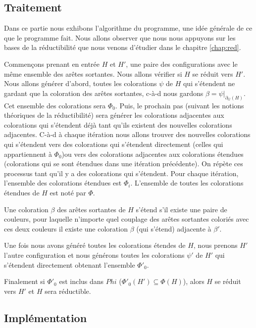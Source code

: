 \documentclass[10pt,a4paper]{article}
\begin{document}
\subsection{Traitement}

Dans ce partie nous exhibons l'algorithme du programme, une idée générale de ce que le programme fait. Nous allons observer que nous nous appuyons sur les bases de la réductibilité que nous venons d'étudier dans le chapitre \ref{chap:red}. 

Commençons prenant en entrée $H$ et $H'$, une paire des configurations avec le même ensemble des arêtes sortantes. Nous allons vérifier si $H$ se réduit vers $H'$. Nous allons générer d'abord, toutes les colorations $\psi$ de $H$ qui s'étendent ne gardant que la coloration des arêtes sortantes, c-à-d nous gardons $\beta = \psi|_{\partial_G(H)}$. Cet ensemble des colorations sera $\Phi_0$. Puis, le prochain pas (suivant les notions théoriques de la réductibilité) sera générer les colorations adjacentes aux colorations qui s'étendent déjà tant qu'ils existent des nouvelles colorations adjacentes. C-à-d à chaque itération nous allons trouver des nouvelles colorations qui s'étendent vers des colorations qui s'étendent directement (celles qui appartiennent à $\Phi_0$)ou vers des colorations adjacentes aux colorations étendues (colorations qui se sont étendues dans une itération précédente). On répète ces processus tant qu'il y a des colorations qui s'étendent. Pour chaque itération, l'ensemble des colorations étendues est $\Phi_i$. L'ensemble de toutes les colorations étendues de $H$ est noté par $\Phi$.

Une coloration $\beta$ des arêtes sortantes de $H$ s'étend s'il existe une paire de couleurs, pour laquelle n'importe quel couplage des arêtes sortantes coloriés avec ces deux couleurs il existe une coloration $\beta$ (qui s'étend) adjacente à $\beta'$.

Une fois nous avons généré toutes les colorations étendes de $H$, nous prenons $H'$ l'autre configuration et nous générons toutes les colorations $\psi'$ de $H'$ qui s'étendent directement obtenant l'ensemble $\Phi'_0$.

Finalement si $\Phi'_0$ est inclus dans $Phi$ ($\Phi'_0(H')\subseteq \Phi(H)$), alors $H$ se réduit vers $H'$ et $H$ sera réductible.

\subsection{Implémentation}
\end{document}
